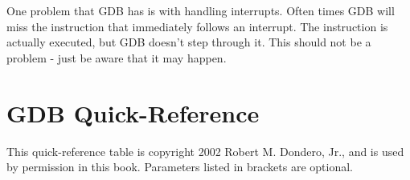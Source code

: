 \begin{sidebar}[Warning]
One problem that GDB has is with handling interrupts.  Often times
GDB will miss the instruction that immediately follows an interrupt.
The instruction is actually executed, but GDB doesn't step through
it.  This should not be a problem - just be aware that it may happen.
\end{sidebar}

\section{GDB Quick-Reference}
\label{gdbquickref}

This quick-reference table is copyright 2002 Robert M. Dondero, Jr., and is used by
permission in this book.  Parameters listed in brackets are optional.

